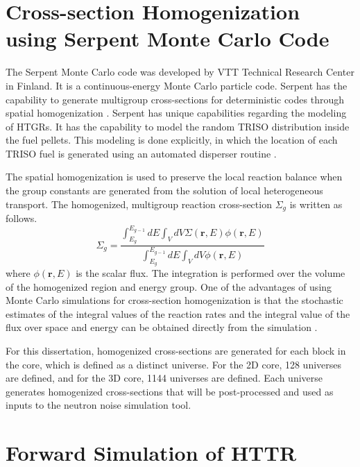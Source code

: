 \section{Cross-section Homogenization using Serpent Monte Carlo Code}

The Serpent Monte Carlo code was developed by VTT Technical Research Center in Finland. It is a continuous-energy Monte Carlo particle code. Serpent has the capability to generate multigroup cross-sections for deterministic codes through spatial homogenization \cite{fridmanRevisedMethodsFewGroup2012, leppanenSerpentMonteCarlo2015}. Serpent has unique capabilities regarding the modeling of HTGRs. It has the capability to model the random TRISO distribution inside the fuel pellets. This modeling is done explicitly, in which the location of each TRISO fuel is generated using an automated disperser routine \cite{leppanenSerpentMonteCarlo2015}.

The spatial homogenization is used to preserve the local reaction balance when the group constants are generated from the solution of local heterogeneous transport. The homogenized, multigroup reaction cross-section $\Sigma_g$ is written as follows.
\begin{equation}
    \Sigma_g = \frac{\int_{E_g}^{E_{g-1}} dE \int_V dV \Sigma(\textbf{r}, E) \phi(\textbf{r}, E)}{\int_{E_g}^{E_{g-1}} dE \int_V dV \phi(\textbf{r}, E)}
\end{equation}
where $\phi(\textbf{r}, E)$ is the scalar flux. The integration is performed over the volume of the homogenized region and energy group. One of the advantages of using Monte Carlo simulations for cross-section homogenization is that the stochastic estimates of the integral values of the reaction rates and the integral value of the flux over space and energy can be obtained directly from the simulation \cite{leppanenOverviewMethodologySpatial2016}.

For this dissertation, homogenized cross-sections are generated for each block in the core, which is defined as a distinct universe. For the 2D core, 128 universes are defined, and for the 3D core, 1144 universes are defined. Each universe generates homogenized cross-sections that will be post-processed and used as inputs to the neutron noise simulation tool.

\section{Forward Simulation of HTTR}

